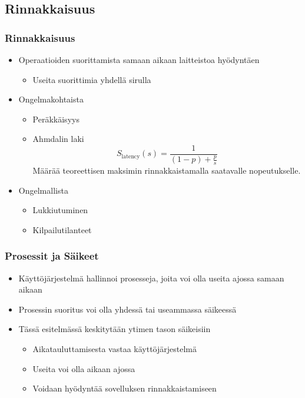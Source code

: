 \documentclass{beamer}
\begin{document}
\subsection{Rinnakkaisuus}
\begin{frame}
    \frametitle{Rinnakkaisuus}
    \begin{itemize}
       \item Operaatioiden suorittamista samaan aikaan laitteistoa hyödyntäen
        \begin{itemize}
            \item Useita suorittimia yhdellä sirulla
        \end{itemize}
        \item Ongelmakohtaista
            \begin{itemize}
                \item Peräkkäisyys
                \item Ahmdalin laki \\
                    \[ S_{\text{latency}}(s) =  \frac{1}{(1-p) + \frac{p}{s}} \]
                    Määrää teoreettisen maksimin rinnakkaistamalla
                    saatavalle nopeutukselle.
            \end{itemize}
        \item Ongelmallista
            \begin{itemize}
                \item Lukkiutuminen
                \item Kilpailutilanteet
            \end{itemize}
    \end{itemize}
\end{frame}

\begin{frame}
    \frametitle{Prosessit ja Säikeet}
    \begin{itemize}
        \item Käyttöjärjestelmä hallinnoi prosesseja, joita
            voi olla useita ajossa samaan aikaan
        \item Prosessin suoritus voi olla yhdessä tai useammassa säikeessä
        \item Tässä esitelmässä keskitytään ytimen tason säikeisiin
            \begin{itemize}
                \item Aikatauluttamisesta vastaa käyttöjärjestelmä
                \item Useita voi olla aikaan ajossa
                \item Voidaan hyödyntää sovelluksen rinnakkaistamiseen
            \end{itemize} 
    \end{itemize}

\end{frame}
\end{document}
